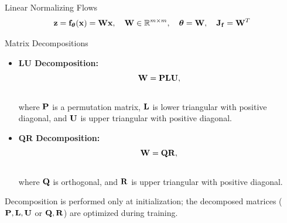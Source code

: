 \documentclass{beamer}
\begin{document}
\begin{frame}{Linear Normalizing Flows}
	\vspace{-0.3cm}
	\[
		\mathbf{z} = \mathbf{f}_{\boldsymbol{\theta}}(\mathbf{x}) = \mathbf{W} \mathbf{x}, \quad \mathbf{W} \in \mathbb{R}^{m \times m}, \quad \boldsymbol{\theta} = \mathbf{W}, \quad \mathbf{J}_{\mathbf{f}} = \mathbf{W}^T
	\]
	\vspace{-0.7cm}
	\begin{block}{Matrix Decompositions}
		\begin{itemize}
			\item \textbf{LU Decomposition:}
			\vspace{-0.3cm}
			\[
				\mathbf{W} = \mathbf{P} \mathbf{L} \mathbf{U},
			\]
			\vspace{-0.7cm} \\
			where $\mathbf{P}$ is a permutation matrix, $\mathbf{L}$ is lower triangular with positive diagonal, and $\mathbf{U}$ is upper triangular with positive diagonal.
			\item \textbf{QR Decomposition:}
			\vspace{-0.3cm}
			\[
				\mathbf{W} = \mathbf{Q} \mathbf{R},
			\]
			\vspace{-0.7cm} \\
			where $\mathbf{Q}$ is orthogonal, and $\mathbf{R}$ is upper triangular with positive diagonal.
		\end{itemize}
	\end{block}

	Decomposition is performed only at initialization; the decomposed matrices ($\mathbf{P}, \mathbf{L}, \mathbf{U}$ or $\mathbf{Q}, \mathbf{R}$) are optimized during training.

\end{frame}
\end{document}
